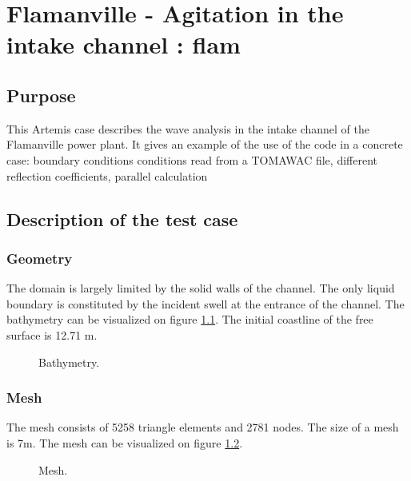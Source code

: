 \chapter{Flamanville - Agitation in the intake channel : flam}

\section{Purpose}
This Artemis case describes the wave analysis in the intake channel of the
Flamanville power plant. It gives an example of the use of the code in a
concrete case: boundary conditions conditions read from a TOMAWAC file,
different reflection coefficients, parallel calculation


\section{ Description of the test case}

\subsection{Geometry}

The domain is largely limited by the solid walls of the channel. The only
liquid boundary is constituted by the incident swell at the entrance of the
channel. The bathymetry can be visualized on figure \ref{fig:flam_bathy}.
The initial coastline
of the free surface is 12.71 m.

\begin{figure}[h]
\begin{center}
\end{center}
\caption{Bathymetry.}
\label{fig:flam_bathy}
\end{figure}

\subsection{Mesh}

The mesh consists of 5258 triangle elements and 2781 nodes. The size
of a mesh is 7m. The mesh can be visualized on figure \ref{fig:flam_mesh}.

\begin{figure}[h]
\begin{center}
\end{center}
\caption{Mesh.}
\label{fig:flam_mesh}
\end{figure}

